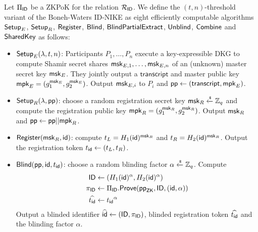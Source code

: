 	
	\begin{definition}
		\label{def:tn_obl_idnike}
		Let $\Pi_{\mathsf{ID}}$ be a ZKPoK for the relation $\mathcal{R}_{\mathsf{ID}}$.
		We define the $(t, n)$-threshold variant of the Boneh-Waters ID-NIKE as eight efficiently computable algorithms $\mathsf{Setup}_E$, $\mathsf{Setup}_R$, $\mathsf{Register}$, $\mathsf{Blind}$, $\mathsf{BlindPartialExtract}$, $\mathsf{Unblind}$, $\mathsf{Combine}$ and $\mathsf{SharedKey}$ as follows:
		\begin{itemize}
			\item $\mathsf{Setup}_E(\lambda, t, n)$: Participants $P_1, \dots , P_n$ execute a key-expressible DKG to compute Shamir secret shares $\mathsf{msk}_{E,1}, \dots , \mathsf{msk}_{E,n}$ of an (unknown) master secret key $\mathsf{msk}_E$.
				They jointly output a $\mathsf{transcript}$ and master public key $\mathsf{mpk}_E = (g_1^{\mathsf{msk}_E}, g_2^{\mathsf{msk}_E})$. Output $\mathsf{msk}_{E,i}$ to $P_i$ and $\mathsf{pp} \leftarrow (\mathsf{transcript}, \mathsf{mpk}_E)$.
			
			\item $\mathsf{Setup}_R(\lambda, \mathsf{pp})$: choose a random registration secret key $\mathsf{msk}_R \xleftarrow{\scriptscriptstyle \$} \mathbb{Z}_q$ and compute the registration public key $\mathsf{mpk}_R = (g_1^{\mathsf{msk}_R}, g_2^{\mathsf{msk}_R})$. Output $\mathsf{msk}_R$ and $\mathsf{pp} \leftarrow \mathsf{pp} || \mathsf{mpk}_R$.
			
			\item $\mathsf{Register}(\mathsf{msk}_R, \mathsf{id})$: compute $t_L = H_1(\mathsf{id})^{\mathsf{msk}_R}$ and $t_R = H_2(\mathsf{id})^{\mathsf{msk}_R}$. Output the registration token $t_{\mathsf{id}} \leftarrow (t_L, t_R)$.
	
			\item $\mathsf{Blind}(\mathsf{pp}, \mathsf{id}, t_{\mathsf{id}})$:
			choose a random blinding factor $\alpha \xleftarrow{\scriptscriptstyle \$} \mathbb{Z}_q$.
			Compute 	
			\begin{equation}
				\begin{aligned}
					\mathsf{ID} &\leftarrow \left(H_1(\mathsf{id})^\alpha, H_2(\mathsf{id})^\alpha \right) \\
					\pi_{\mathsf{ID}} &\leftarrow \Pi_{\mathsf{ID}}.\mathsf{Prove}(\mathsf{pp}_{\mathsf{ZK}}, \mathsf{ID}, (\mathsf{id}, \alpha)) \\
					\widehat{t_{\mathsf{id}}} &\leftarrow {t_{\mathsf{id}}}^\alpha 
				\end{aligned} 
			\end{equation}
			Output a blinded identifier $\widehat{\mathsf{id}} \leftarrow (\mathsf{ID}, \pi_{\mathsf{ID}})$, blinded registration token $\widehat{t_{\mathsf{id}}}$ and the blinding factor $\alpha$.
			

\end{itemize}
\end{definition}
